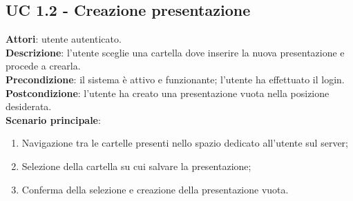 \subsection{UC 1.2 - Creazione presentazione}{
	\label{uc1.2}
	\textbf{Attori}: utente autenticato.	\\
	\textbf{Descrizione}: l'utente sceglie una cartella dove inserire la nuova presentazione e procede a crearla.	\\
	\textbf{Precondizione}: il sistema è attivo e funzionante; l'utente ha effettuato il login.	\\
	\textbf{Postcondizione}: l'utente ha creato una presentazione vuota nella posizione desiderata.	\\
	\textbf{Scenario principale}:
	\begin{enumerate}
		\item Navigazione tra le cartelle presenti nello spazio dedicato all'utente sul server;
		\item Selezione della cartella su cui salvare la presentazione;
		\item Conferma della selezione e creazione della presentazione vuota.
	\end{enumerate}
	}